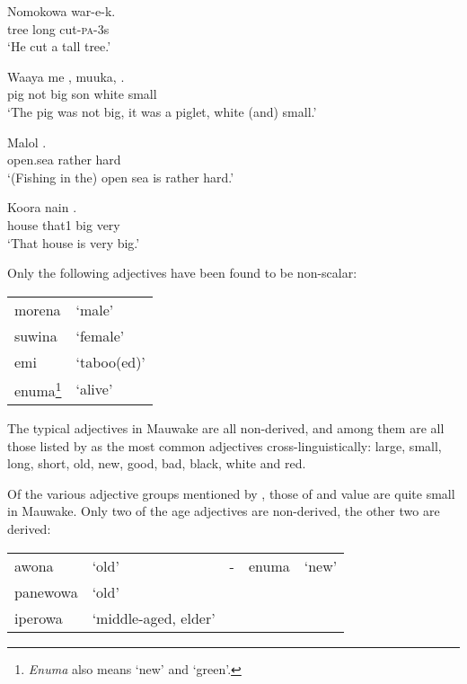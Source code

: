 \ea%
\label{ex:x70}
\gll Nomokowa  war-e-k. \\
tree long cut-\textsc{pa}-3s\\
\glt`He cut a tall tree.'
\z

\ea%
\label{ex:x71}
\gll Waaya me , muuka,  . \\
pig not big son white small\\
\glt`The pig was not big, it was a piglet, white (and) small.'
\z

\ea%
\label{ex:x72}
\gll Malol  . \\
open.sea rather hard\\
\glt`(Fishing in the) open sea is rather hard.'
\z

\ea%
\label{ex:x73}
\gll Koora nain  . \\
house that1 big very\\
\glt`That house is very big.'
\z

Only the following adjectives have been found to be non-scalar:

\begin{tabular}{ll}
morena &`male'\\
suwina &`female'\\
emi &`taboo(ed)'\\
enuma\footnote{\textit{Enuma} also means `new' and `green'.} &`alive'\\
\end{tabular}

The typical adjectives in Mauwake are all non-derived, and among them are all those listed by \citet[23]{Dixon1977} as the most common adjectives cross-linguistically: large, small, long, short, old, new, good, bad, black, white and red.

Of the various adjective groups mentioned by \citet{Dixon1977}, those of  and value are quite small in Mauwake. Only two of the age adjectives are non-derived, the other two are derived:

\begin{tabular}{llcll}
awona &`old' &- &enuma &`new'\\
panewowa &`old' &&&\\
iperowa &`middle-aged, elder'&&&\\
\end{tabular}

